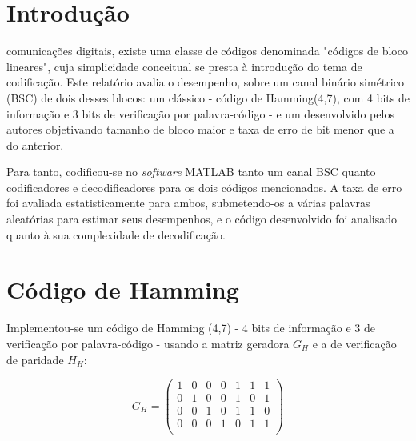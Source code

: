 \documentclass[journal,comsoc]{IEEEtran}
\begin{document}
    \section{Introdução}
     comunicações digitais, existe uma classe de códigos 
    denominada "códigos de bloco lineares", cuja simplicidade conceitual se
    presta à introdução do tema de codificação. Este relatório avalia o desempenho,
    sobre um canal binário simétrico (BSC) de dois desses blocos: um clássico - 
    código de Hamming(4,7), com 4 bits de informação e 3 bits de verificação por
    palavra-código - e um desenvolvido pelos autores objetivando tamanho de bloco
    maior e taxa de erro de bit menor que a do anterior.

    Para tanto, codificou-se no \textit{software} MATLAB tanto um canal BSC quanto
    codificadores e decodificadores para os dois códigos mencionados. A taxa de erro
    foi avaliada estatisticamente para ambos, submetendo-os a várias palavras 
    aleatórias para estimar seus desempenhos, e o código desenvolvido foi analisado
    quanto à sua complexidade de decodificação.


    
     

    \section{Código de Hamming}

    Implementou-se um código de Hamming (4,7) - 4 bits de informação
    e 3 de verificação por palavra-código - usando a matriz geradora
    $G_H$ e a de verificação de paridade $H_H$:

    \begin{equation}
        G_H=\left(
        \begin{array}{ccccccc}
        1 & 0 & 0 & 0 & 1 & 1 & 1 \\
        0 & 1 & 0 & 0 & 1 & 0 & 1 \\
        0 & 0 & 1 & 0 & 1 & 1 & 0 \\
        0 & 0 & 0 & 1 & 0 & 1 & 1 \\
        \end{array}
        \right)
    \end{equation}
\end{document}
